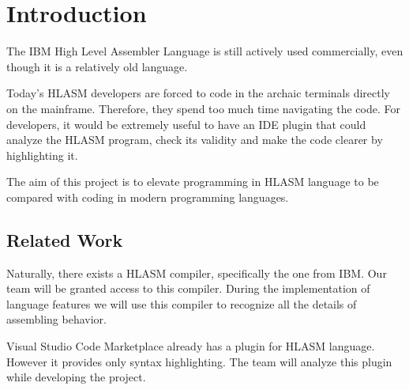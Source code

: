 \chapter*{Introduction}


The IBM High Level Assembler Language is still actively used commercially, even though it is a relatively old language. 

Today's HLASM developers are forced to code in the archaic terminals directly on the mainframe. Therefore, they spend too much time navigating the code. For developers, it would be extremely useful to have an IDE plugin that could analyze the HLASM program, check its validity and make the code clearer by highlighting it. 

The aim of this project is to elevate programming in HLASM language to be compared with coding in modern programming languages.

\section*{Related Work}
Naturally, there exists a HLASM compiler, specifically the one from IBM. Our team will be granted access to this compiler. During the implementation of language features we will use this compiler to recognize all the details of assembling behavior. 

Visual Studio Code Marketplace already has a plugin for HLASM language. However it provides only syntax highlighting. The team will analyze this plugin while developing the project.